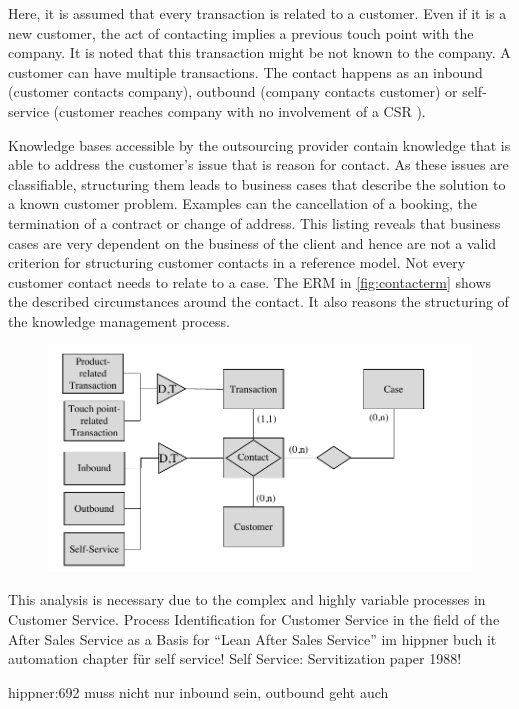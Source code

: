 	Here, it is assumed that every transaction is related to a customer. Even if it is a new customer, the act of contacting implies a previous touch point with the company. It is noted that this transaction might be not known to the company. A customer can have multiple transactions. The contact happens as an inbound (customer contacts company), outbound (company contacts customer) or self-service (customer reaches company with no involvement of a \acrshort{CSR} ). 
	
	Knowledge bases accessible by the outsourcing provider contain knowledge that is able to address the customer's issue that is reason for contact. As these issues are classifiable, structuring them leads to business cases that describe the solution to a known customer problem. Examples can the cancellation of a booking, the termination of a contract or change of address. This listing reveals that business cases are very dependent on the business of the client and hence are not a valid criterion for structuring customer contacts in a reference model. Not every customer contact needs to relate to a case. The \acrshort{ERM} in \Fig \ref{fig:contacterm} shows the described circumstances around the contact. It also reasons the structuring of the knowledge management process. 
	
	\begin{figure}[caption={Framework}, label={fig:contacterm}]
		{	\includegraphics[width=.8\textwidth]{figures/contacterm.pdf}}
	\end{figure} 

	
	This analysis is necessary due to the complex and highly variable processes in Customer Service. Process Identification for Customer Service in the field of the After Sales Service as a Basis for “Lean After Sales Service”
	im hippner buch it automation chapter für self service!
	Self Service: Servitization paper 1988!
	
	hippner:692 muss nicht nur inbound sein, outbound geht auch
	
